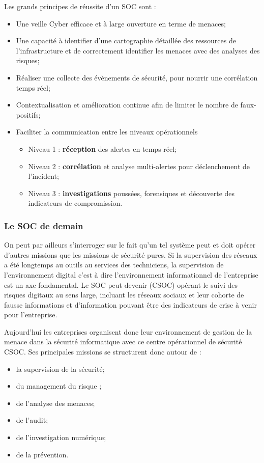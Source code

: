 Les grands principes de réussite d’un SOC sont : 

\begin{itemize}
  \item Une veille Cyber efficace et à large ouverture en terme de menaces;
  \item Une capacité à identifier d’une cartographie détaillée des ressources de l’infrastructure et de correctement identifier les menaces avec des analyses des risques;
  \item Réaliser une collecte des évènements de sécurité, pour nourrir une corrélation temps réel;
  \item Contextualisation et amélioration continue afin de limiter le nombre de faux-positifs;
  \item Faciliter la communication entre les niveaux opérationnels
\begin{itemize}
\item Niveau 1 : \textbf{réception} des alertes en temps réel;
\item Niveau 2 : \textbf{corrélation} et analyse multi-alertes pour déclenchement de l’incident;
\item Niveau 3 : \textbf{investigations} poussées, forensiques et découverte des indicateurs de compromission.
\end{itemize}
\end{itemize}


\subsubsection{Le SOC de demain}
On peut par ailleurs s'interroger sur le fait qu'un tel système peut et doit opérer d'autres missions que les missions de sécurité pures. Si la supervision des réseaux a été longtemps au outils au services des techniciens, la supervision de l'environnement digital c'est à dire l'environnement informationnel de l'entreprise est un axe fondamental. Le SOC peut devenir  (CSOC) opérant le suivi des risques digitaux au sens large, incluant les réseaux sociaux et leur cohorte de fausse informations et d'information pouvant être des indicateurs de crise à venir pour l'entreprise.

Aujourd’hui les entreprises organisent donc leur environnement de gestion de la menace dans la sécurité informatique avec ce centre opérationnel de sécurité CSOC. Ses principales missions se structurent donc autour de  : 

\begin{itemize}
  \item la supervision de la sécurité;
  \item du management du risque ;
  \item de l’analyse des menaces;
  \item de l’audit;
  \item de l’investigation numérique;
  \item de la prévention.
\end{itemize}

